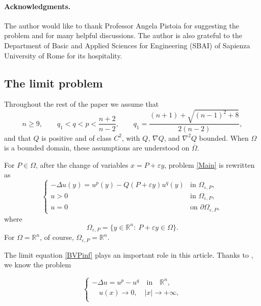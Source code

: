 \documentclass[12pt]{amsart}
\theoremstyle{plain}
\theoremstyle{definition}
\theoremstyle{remark}
\renewcommand{\epsilon}{\varepsilon}
\begin{document}
\paragraph{Acknowledgments.}
The author would like to thank Professor Angela Pistoia for suggesting the
problem and for many helpful discussions. The author is also grateful to
the Department of Basic and Applied Sciences for Engineering (SBAI) of
Sapienza University of Rome for its hospitality.

\begin{center}
\section{The limit problem}
\end{center}

Throughout the rest of the paper we assume that
\[
 n\geq 9,\qquad
 q_1<q<p<\frac{n+2}{n-2},
 \qquad
 q_1=\frac{(n+1)+\sqrt{(n-1)^2+8}}{2(n-2)},
\]
and that \(Q\) is positive and of class \(C^2\), with
\(Q\), \(\nabla Q\), and \(\nabla^2Q\) bounded. When \(\Omega\) is a
bounded domain, these assumptions are understood on \(\overline\Omega\).

For \(P\in\Omega\), after the change of variables \(x=P+\epsilon y\),
problem \eqref{Main} is rewritten as
\begin{equation}\label{BVP1}\tag{$5$}
 \begin{cases}
 -\Delta u(y)=u^p(y)-Q(P+\epsilon y)u^q(y)
     & \text{in }\Omega_{\epsilon,P},\\
 u>0 & \text{in }\Omega_{\epsilon,P},\\
 u=0 & \text{on }\partial\Omega_{\epsilon,P},
 \end{cases}
\end{equation}
where
\[
 \Omega_{\epsilon,P}
 =
 \{y\in\mathbb{R}^n:\ P+\epsilon y\in\Omega\}.
\]
For \(\Omega=\mathbb{R}^n\), of course,
\(\Omega_{\epsilon,P}=\mathbb{R}^n\).

The limit equation \eqref{BVPinf} plays an important role in this article. Thanks to \cite{LiNi1993,KwongZhang1991,BerestyckiLions1983}, we know  the problem 

\begin{equation*}\label{BVP0} 
 \begin{cases} 
 -\Delta u=u^p-u^q\quad  \text{in} \quad \mathbb{R}^n, \\
        \quad u(x) \rightarrow0, \quad |x|\rightarrow +\infty,\\
       
     
\end{cases}
\end{equation*} 
\end{document}
